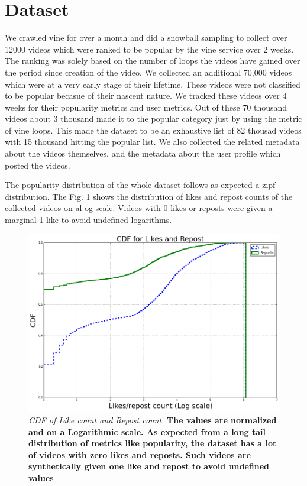 \section{ Dataset }
We crawled vine for over a month and did a snowball sampling to collect over 12000 videos which were ranked to be popular by the vine service over 2 weeks. The ranking was solely based on the number of loops the videos have gained over the period since creation of the video. We collected an additional 70,000 videos which were at a very early stage of their lifetime. These videos were not classified to be popular becasue of their nascent nature. We tracked these videos over 4 weeks for their popularity metrics and user metrics.
Out of these 70 thousand videos about 3 thousand made it to the popular category just by using the metric of vine loops. This made the dataset to be an exhaustive list of 82 thousad videos with 15 thousand hitting the popular list.
We also collected the related metadata about the videos themselves, and the metadata about the user profile which posted the videos. 
\par  
The popularity distribution of the whole dataset follows as expected a zipf distribution. The Fig. 1 shows the distribution of likes and repost counts of the collected videos on al og scale. Videos with 0 likes or reposts were given a marginal 1 like to avoid undefined logarithms. 


\begin{figure}[!htb]
\centering
\includegraphics[width=\columnwidth]{plots/CDF_Like_reposts}
\caption{\textsl{ CDF of Like count and Repost count.} \textbf{The values are normalized and on a Logarithmic scale. As expected from a long tail distribution of metrics like popularity, the dataset has a lot of videos with zero likes and reposts. Such videos are synthetically given one like and repost to avoid undefined values}}
\label{fig:CDF_posts}
\end{figure}

